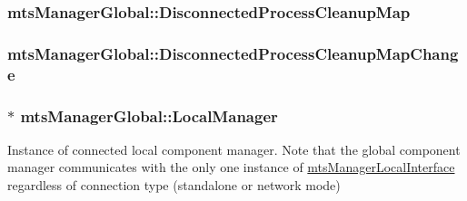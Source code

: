 \hypertarget{classmts_manager_global_ac3feb6deab8ad8d30b35000c776f4a9e}{
\subsubsection[{Disconnected\-Process\-Cleanup\-Map}]{ mts\-Manager\-Global\-::\-Disconnected\-Process\-Cleanup\-Map\hspace{0.3cm}{\ttfamily [protected]}}}\label{classmts_manager_global_ac3feb6deab8ad8d30b35000c776f4a9e}
\hypertarget{classmts_manager_global_a91aa784dfa7f9a8ba3cc4f8964840032}{
\subsubsection[{Disconnected\-Process\-Cleanup\-Map\-Change}]{ mts\-Manager\-Global\-::\-Disconnected\-Process\-Cleanup\-Map\-Change\hspace{0.3cm}{\ttfamily [protected]}}}\label{classmts_manager_global_a91aa784dfa7f9a8ba3cc4f8964840032}
\hypertarget{classmts_manager_global_aedcd7068710cbb38fae05e62b5d57d10}{
\subsubsection[{Local\-Manager}]{$\ast$ mts\-Manager\-Global\-::\-Local\-Manager\hspace{0.3cm}{\ttfamily [protected]}}}\label{classmts_manager_global_aedcd7068710cbb38fae05e62b5d57d10}
Instance of connected local component manager. Note that the global component manager communicates with the only one instance of \hyperlink{classmts_manager_local_interface}{mts\-Manager\-Local\-Interface} regardless of connection type (standalone or network mode)

